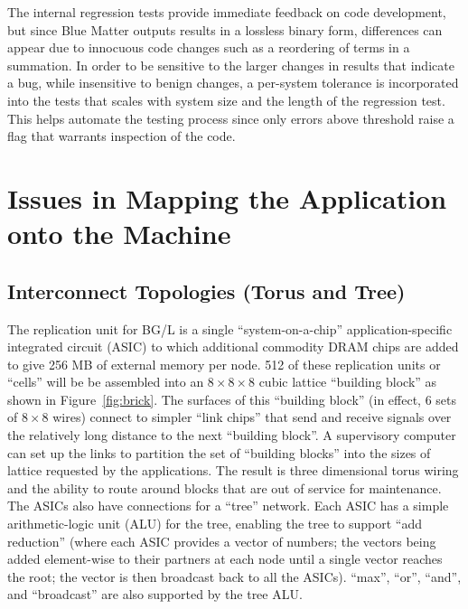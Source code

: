 \documentclass[doublespacing]{elsart}
\begin{document}
The internal regression tests provide immediate feedback on code development,
but since Blue Matter outputs results in a lossless binary form, differences
can appear due to innocuous code changes such as a reordering of terms in a
summation.  In order to be sensitive to the larger changes in results that
indicate a bug, while insensitive to benign changes, a per-system tolerance
is incorporated into the tests that scales with system size and the length
of the regression test.  This helps automate the testing process since only
errors above threshold raise a flag that warrants inspection of the code.

\section{Issues in Mapping the Application onto the Machine}

\subsection{Interconnect Topologies (Torus and Tree)}

The replication unit for BG/L is a single ``system-on-a-chip''
application-specific integrated circuit (ASIC) to which additional
commodity DRAM chips are added to give 256 MB of external memory per
node.  512 of these replication units or ``cells'' will be be
assembled into an $8\times 8\times 8$ cubic lattice ``building block''
as shown in Figure~\ref{fig:brick}. The surfaces of this ``building
block'' (in effect, 6 sets of $8\times 8$ wires) connect to simpler
``link chips'' that send and receive signals over the relatively long
distance to the next ``building block''. A supervisory computer can
set up the links to partition the set of ``building blocks'' into the
sizes of lattice requested by the applications.  The result is three
dimensional torus wiring and the ability to route around blocks that
are out of service for maintenance. The ASICs also have connections
for a ``tree'' network. Each ASIC has a simple arithmetic-logic unit
(ALU) for the tree, enabling the tree to support ``add reduction''
(where each ASIC provides a vector of numbers; the vectors being added
element-wise to their partners at each node until a single vector
reaches the root; the vector is then broadcast back to all the
ASICs). ``max'', ``or'', ``and'', and ``broadcast'' are also supported
by the tree ALU.
\end{document}
